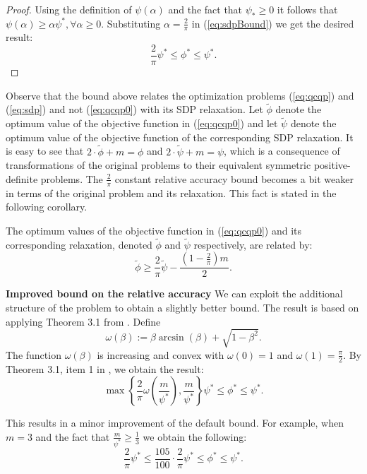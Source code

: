 \begin{proof}
 Using the definition of $\psi\left(\alpha\right)$ and the fact that $\psi_* \geq 0$ it follows that $\psi\left(\alpha\right) \geq \alpha \psi^* ,\forall \alpha \geq 0$. Substituting $\alpha = \frac{2}{\pi}$ in (\ref{eq:sdpBound}) we get the desired result:
 $$\frac{2}{\pi} \psi^* \leq \phi^* \leq \psi^*.$$
\end{proof}


Observe that the bound above relates the optimization problems (\ref{eq:qcqp}) and (\ref{eq:sdp}) and not (\ref{eq:qcqp0}) with its SDP relaxation. Let $\widetilde{\phi}$ denote the optimum value of the objective function in (\ref{eq:qcqp0}) and let $\widetilde{\psi}$ denote the optimum value of the objective function of the corresponding SDP relaxation. It is easy to see that $2 \cdot \widetilde{\phi} + m = \phi$ and $2 \cdot \widetilde{\psi} + m = \psi$, which is a consequence of transformations of the original problems to their equivalent symmetric positive-definite problems. The $\frac{2}{\pi}$ constant relative accuracy bound becomes a bit weaker in terms of the original problem and its relaxation. This fact is stated in the following corollary.
\begin{corollary}
The optimum values of the objective function in (\ref{eq:qcqp0}) and its corresponding relaxation, denoted $\widetilde{\phi}$ and $\widetilde{\psi}$ respectively, are related by:
$$\widetilde{\phi} \geq \frac{2}{\pi} \widetilde{\psi} - \frac{(1 - \frac{2}{\pi}) m}{2}.$$
\end{corollary}


\noindent\textbf{Improved bound on the relative accuracy}
We can exploit the additional structure of the problem to obtain a slightly better bound. The result is based on applying Theorem 3.1 from \cite{Nesterov98globalquadratic}.
%
Define
$$\omega\left(\beta\right) := \beta \arcsin\left(\beta\right) + \sqrt{1 - \beta^2}.$$
The function $\omega\left(\beta\right)$ is increasing and convex with $\omega\left(0\right) = 1$ and $\omega\left(1\right) = \frac{\pi}{2}$.
%
%
By Theorem 3.1, item 1 in \cite{Nesterov98globalquadratic}, we obtain the result:
$$ \max\left\{\frac{2}{\pi}\omega\left(\frac{m}{\psi^*}\right), \frac{m}{\psi^*} \right\}   \psi^* \leq \phi^* \leq \psi^*.$$

This results in a minor improvement of the default bound. For example, when $m = 3$ and the fact that $\frac{m}{\psi^*} \geq \frac{1}{3}$ we obtain the following:
$$ \frac{2}{\pi} \psi^* \leq \frac{105}{100}  \cdot \frac{2}{\pi} \psi^* \leq \phi^* \leq \psi^*.$$




